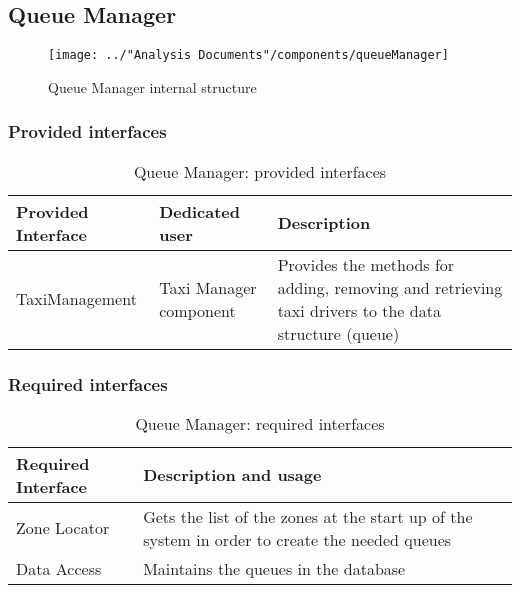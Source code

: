 \subsection{Queue Manager}\label{comp:queueManager}
\begin{figure}[H]
	\centering
	\texttt{[image: ../"Analysis Documents"/components/queueManager]}
	\label{fig:queuemanager}
	\caption{Queue Manager internal structure}
\end{figure}
\subsubsection{Provided interfaces}
\begin{table}[H]
	\begin{longtable}{| p{} | p{} | p{} |}
		\hline
		\textbf{Provided Interface} & \textbf{Dedicated user} & \textbf{Description} \\ \hline
		TaxiManagement & Taxi Manager component & Provides the methods for adding, removing and retrieving taxi drivers to the data structure (queue) \\ \hline
	\end{longtable}
	\caption{Queue Manager: provided interfaces}
	\label{tab:queuemanager:providedInterfaces}
\end{table}
\subsubsection{Required interfaces}
\begin{table}[H]
	\begin{longtable}{| l | p{} |}
		\hline
		\textbf{Required Interface} & \textbf{Description and usage} \\ \hline
		Zone Locator & Gets the list of the zones at the start up of the system in order to create the needed queues \\ \hline
		Data Access & Maintains the queues in the database \\ \hline
	\end{longtable}
	\caption{Queue Manager: required interfaces}
	\label{tab:queuemanager:requiredInterfaces}
\end{table}
